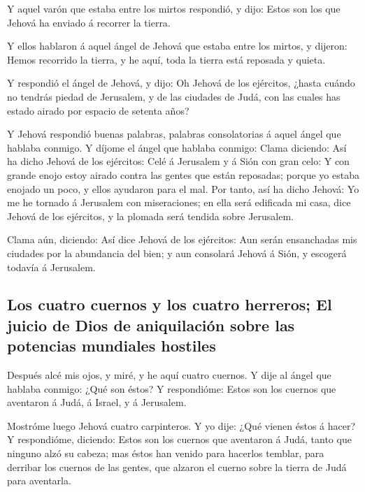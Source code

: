  Y aquel varón que estaba entre los mirtos respondió, y
dijo: Estos son los que Jehová ha enviado á recorrer la tierra.

 Y ellos hablaron á aquel ángel de Jehová que estaba
entre los mirtos, y dijeron: Hemos recorrido la tierra, y he aquí, toda
la tierra está reposada y quieta.

 Y respondió el ángel de Jehová, y dijo: Oh Jehová de los
ejércitos, ¿hasta cuándo no tendrás piedad de Jerusalem, y de las
ciudades de Judá, con las cuales has estado airado por espacio de
setenta años?

 Y Jehová respondió buenas palabras, palabras
consolatorias á aquel ángel que hablaba conmigo.  Y
díjome el ángel que hablaba conmigo: Clama diciendo: Así ha dicho Jehová
de los ejércitos: Celé á Jerusalem y á Sión con gran celo:
 Y con grande enojo estoy airado contra las gentes que
están reposadas; porque yo estaba enojado un poco, y ellos ayudaron para
el mal.  Por tanto, así ha dicho Jehová: Yo me he tornado
á Jerusalem con miseraciones; en ella será edificada mi casa, dice
Jehová de los ejércitos, y la plomada será tendida sobre Jerusalem.

 Clama aún, diciendo: Así dice Jehová de los ejércitos:
Aun serán ensanchadas mis ciudades por la abundancia del bien; y aun
consolará Jehová á Sión, y escogerá todavía á Jerusalem.

\hypertarget{los-cuatro-cuernos-y-los-cuatro-herreros-el-juicio-de-dios-de-aniquilaciuxf3n-sobre-las-potencias-mundiales-hostiles}{%
\subsection{Los cuatro cuernos y los cuatro herreros; El juicio de Dios
de aniquilación sobre las potencias mundiales
hostiles}\label{los-cuatro-cuernos-y-los-cuatro-herreros-el-juicio-de-dios-de-aniquilaciuxf3n-sobre-las-potencias-mundiales-hostiles}}

 Después alcé mis ojos, y miré, y he aquí cuatro cuernos.
 Y dije al ángel que hablaba conmigo: ¿Qué son éstos? Y
respondióme: Estos son los cuernos que aventaron á Judá, á Israel, y á
Jerusalem.

 Mostróme luego Jehová cuatro carpinteros.
 Y yo dije: ¿Qué vienen éstos á hacer? Y respondióme,
diciendo: Estos son los cuernos que aventaron á Judá, tanto que ninguno
alzó su cabeza; mas éstos han venido para hacerlos temblar, para
derribar los cuernos de las gentes, que alzaron el cuerno sobre la
tierra de Judá para aventarla.

